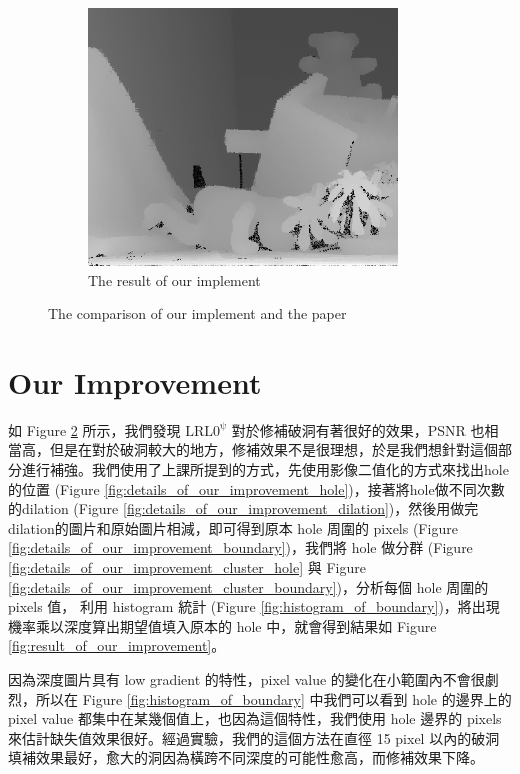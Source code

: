 \documentclass{article}
\begin{document}
\begin{CJK*}{UTF8}{bkai}
\begin{figure}[h]
\begin{subfigure}[h]{0.3\textwidth}
        \centering
        \includegraphics[width=0.9\textwidth]{imgs/Teddy_lrl0phi.png}
        \caption{The result of our implement}
    \label{fig:after_lrl0psi}
    \end{subfigure}
    \caption{The comparison of our implement and the paper}
    \label{fig:result_of_lrl0psi}
\end{figure}


\section{Our Improvement}

如 Figure \ref{fig:result_of_lrl0psi} 所示，我們發現 $\mathrm{LRL0^{\psi}}$ 對於修補破洞有著很好的效果，PSNR 也相當高，但是在對於破洞較大的地方，修補效果不是很理想，於是我們想針對這個部分進行補強。我們使用了上課所提到的方式，先使用影像二值化的方式來找出hole的位置 (Figure \ref{fig:details_of_our_improvement_hole})，接著將hole做不同次數的dilation (Figure \ref{fig:details_of_our_improvement_dilation})，然後用做完dilation的圖片和原始圖片相減，即可得到原本 hole 周圍的 pixels (Figure \ref{fig:details_of_our_improvement_boundary})，我們將 hole 做分群 (Figure \ref{fig:details_of_our_improvement_cluster_hole} 與 Figure \ref{fig:details_of_our_improvement_cluster_boundary})，分析每個 hole 周圍的 pixels 值，
利用 histogram 統計 (Figure \ref{fig:histogram_of_boundary})，將出現機率乘以深度算出期望值填入原本的 hole 中，就會得到結果如 Figure \ref{fig:result_of_our_improvement}。

因為深度圖片具有 low gradient 的特性，pixel value 的變化在小範圍內不會很劇烈，所以在 Figure \ref{fig:histogram_of_boundary} 中我們可以看到 hole 的邊界上的 pixel value 都集中在某幾個值上，也因為這個特性，我們使用 hole 邊界的 pixels 來估計缺失值效果很好。經過實驗，我們的這個方法在直徑 15 pixel 以內的破洞填補效果最好，愈大的洞因為橫跨不同深度的可能性愈高，而修補效果下降。


\end{CJK*}
\end{document}
